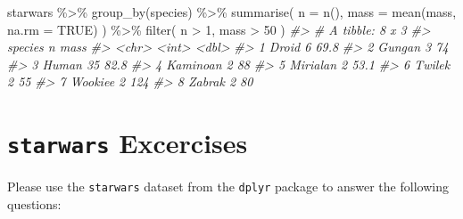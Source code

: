 \documentclass[
]{book}
\newenvironment{Shaded}{\begin{snugshade}}{\end{snugshade}}
\newcommand{\AttributeTok}[1]{\textcolor[rgb]{0.77,0.63,0.00}{#1}}
\newcommand{\CommentTok}[1]{\textcolor[rgb]{0.56,0.35,0.01}{\textit{#1}}}
\newcommand{\ConstantTok}[1]{\textcolor[rgb]{0.00,0.00,0.00}{#1}}
\newcommand{\DecValTok}[1]{\textcolor[rgb]{0.00,0.00,0.81}{#1}}
\newcommand{\FunctionTok}[1]{\textcolor[rgb]{0.00,0.00,0.00}{#1}}
\newcommand{\NormalTok}[1]{#1}
\newcommand{\SpecialCharTok}[1]{\textcolor[rgb]{0.00,0.00,0.00}{#1}}
\begin{document}
\begin{Shaded}
\begin{Highlighting}[]
\NormalTok{starwars }\SpecialCharTok{\%\textgreater{}\%}
  \FunctionTok{group\_by}\NormalTok{(species) }\SpecialCharTok{\%\textgreater{}\%}
  \FunctionTok{summarise}\NormalTok{(}
    \AttributeTok{n =} \FunctionTok{n}\NormalTok{(),}
    \AttributeTok{mass =} \FunctionTok{mean}\NormalTok{(mass, }\AttributeTok{na.rm =} \ConstantTok{TRUE}\NormalTok{)}
\NormalTok{  ) }\SpecialCharTok{\%\textgreater{}\%}
  \FunctionTok{filter}\NormalTok{(}
\NormalTok{    n }\SpecialCharTok{\textgreater{}} \DecValTok{1}\NormalTok{,}
\NormalTok{    mass }\SpecialCharTok{\textgreater{}} \DecValTok{50}
\NormalTok{  )}
\CommentTok{\#\textgreater{} \# A tibble: 8 x 3}
\CommentTok{\#\textgreater{}   species      n  mass}
\CommentTok{\#\textgreater{}   \textless{}chr\textgreater{}    \textless{}int\textgreater{} \textless{}dbl\textgreater{}}
\CommentTok{\#\textgreater{} 1 Droid        6  69.8}
\CommentTok{\#\textgreater{} 2 Gungan       3  74  }
\CommentTok{\#\textgreater{} 3 Human       35  82.8}
\CommentTok{\#\textgreater{} 4 Kaminoan     2  88  }
\CommentTok{\#\textgreater{} 5 Mirialan     2  53.1}
\CommentTok{\#\textgreater{} 6 Twi\textquotesingle{}lek      2  55  }
\CommentTok{\#\textgreater{} 7 Wookiee      2 124  }
\CommentTok{\#\textgreater{} 8 Zabrak       2  80}
\end{Highlighting}
\end{Shaded}

\hypertarget{starwars-excercises}{%
\chapter{\texorpdfstring{\texttt{starwars} Excercises}{starwars Excercises}}\label{starwars-excercises}}

Please use the \texttt{starwars} dataset from the \texttt{dplyr} package to answer the following questions:
\end{document}
